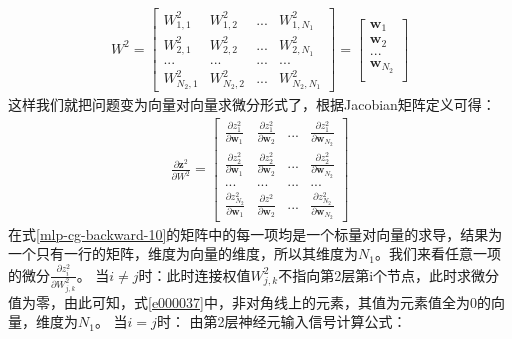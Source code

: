 \documentclass[UTF8]{article}
\begin{document}
\begin{equation}
\begin{aligned}
W^2=\begin{bmatrix}
W^2_{1,1} & W^2_{1,2} & ... & W^2_{1,N_1} \\
W^2_{2,1} & W^2_{2,2} & ... & W^2_{2,N_1} \\
... & ... & ... & ... \\

W^2_{N_2,1} & W^2_{N_2,2} & ... & W^2_{N_2,N_1}
\end{bmatrix}=\begin{bmatrix}
\boldsymbol{w}_1 \\
\boldsymbol{w}_2 \\
... \\
\boldsymbol{w}_{N_2} \\
\end{bmatrix}
\end{aligned}
\label{mlp-cg-backward-9}
\end{equation}
这样我们就把问题变为向量对向量求微分形式了，根据Jacobian矩阵定义可得：
\begin{equation}
\begin{aligned}
\frac{\partial{\boldsymbol{z}^2}}{\partial{W^2}}=\begin{bmatrix}
\frac{\partial{z^2_1}}{\partial{\boldsymbol{w}_1}} & \frac{\partial{z^2_1}}{\partial{\boldsymbol{w}_2}} & ... & \frac{\partial{z^2_1}}{\partial{\boldsymbol{w}_{N_2}}} \\
\frac{\partial{z^2_2}}{\partial{\boldsymbol{w}_1}} & \frac{\partial{z^2_2}}{\partial{\boldsymbol{w}_2}} & ... & \frac{\partial{z^2_2}}{\partial{\boldsymbol{w}_{N_2}}} \\
... & ... & ... & ... \\

\frac{\partial{z^2_{N_2}}}{\partial{\boldsymbol{w}_1}} & \frac{\partial{z^2_{}}}{\partial{\boldsymbol{w}_2}} & ... & \frac{\partial{z^2_{N_2}}}{\partial{\boldsymbol{w}_{N_2}}}
\end{bmatrix}
\end{aligned}
\label{mlp-cg-backward-10}
\end{equation}
在式\ref{mlp-cg-backward-10}的矩阵中的每一项均是一个标量对向量的求导，结果为一个只有一行的矩阵，维度为向量的维度，所以其维度为$N_1$。我们来看任意一项的微分$\frac{\partial{z^2_i}} {\partial{W^2_{j,k}}}$。
当$i \ne j$时：此时连接权值$W^2_{j,k}$不指向第2层第i个节点，此时求微分值为零，由此可知，式\ref{e000037}中，非对角线上的元素，其值为元素值全为0的向量，维度为$N_1$。
当$i=j$时：
由第2层神经元输入信号计算公式：
\end{document}
